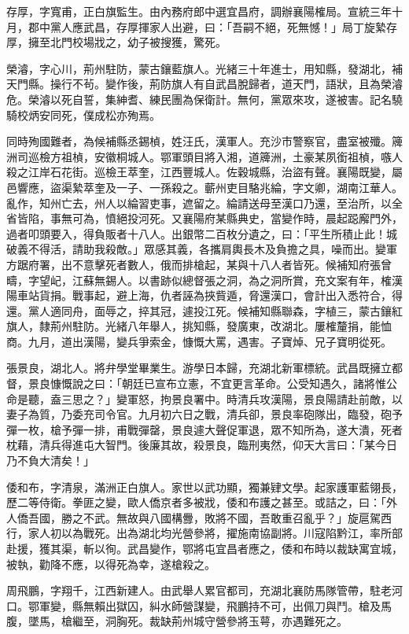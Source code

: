 \begin{pinyinscope}
存厚，字寬甫，正白旗監生。由內務府郎中選宜昌府，調辦襄陽榷局。宣統三年十月，郡中黨人應武昌，存厚揮家人出避，曰：「吾嗣不絕，死無憾！」局丁旋縶存厚，擁至北門校場戕之，幼子被搜獲，驚死。

榮濬，字心川，荊州駐防，蒙古鑲藍旗人。光緒三十年進士，用知縣，發湖北，補天門縣。操行不茍。變作後，荊防旗人有自武昌脫歸者，道天門，語狀，且為榮濬危。榮濬以死自誓，集紳耆、練民團為保衛計。無何，黨眾來攻，遂被害。記名驍騎校炳安同死，僕成松亦殉焉。

同時殉國難者，為候補縣丞錫楨，姓汪氏，漢軍人。充沙市警察官，盡室被殲。簰洲司巡檢方祖楨，安徽桐城人。鄂軍頭目將入湘，道簰洲，土豪某夙銜祖楨，嗾人殺之江岸石花街。巡檢王萃奎，江西豐城人。佐穀城縣，治盜有聲。襄陽既變，屬邑響應，盜渠縶萃奎及一子、一孫殺之。蘄州吏目駱兆綸，字文卿，湖南江華人。亂作，知州亡去，州人以綸習吏事，遮留之。綸請送母至漢口乃還，至治所，以全省皆陷，事無可為，憤絕投河死。又襄陽府某縣典史，當變作時，晨起跽廨門外，過者叩頭要入，得負販者十八人。出銀幣二百枚分遺之，曰：「平生所積止此！城破義不得活，請助我殺敵。」眾感其義，各攜肩輿長木及負擔之具，噪而出。變軍方踞府署，出不意擊死者數人，俄而排槍起，某與十八人者皆死。候補知府張曾疇，字望屺，江蘇無錫人。以書跡似總督張之洞，為之洞所賞，充文案有年，榷漢陽車站貨捐。戰事起，避上海，仇者誣為挾貲遁，脅還漢口，會計出入悉符合，得還。黨人適同舟，面辱之，捽其冠，遽投江死。候補知縣聯森，字植三，蒙古鑲紅旗人，隸荊州駐防。光緒八年舉人，挑知縣，發廣東，改湖北。屢榷釐捐，能恤商。九月，道出漢陽，變兵爭索金，慷慨大罵，遇害。子寶焯、兄子寶明從死。

張景良，湖北人。將弁學堂畢業生。游學日本歸，充湖北新軍標統。武昌既擁立都督，景良慷慨說之曰：「朝廷已宣布立憲，不宜更言革命。公受知遇久，諸將惟公命是聽，盍三思之？」變軍怒，拘景良署中。時清兵攻漢陽，景良陽請赴前敵，以妻子為質，乃委充司令官。九月初六日之戰，清兵卻，景良率砲隊出，臨發，砲予彈一枚，槍予彈一排，甫戰彈罄，景良遽大聲促軍退，眾不知所為，遂大潰，死者枕藉，清兵得進屯大智門。後廉其故，殺景良，臨刑夷然，仰天大言曰：「某今日乃不負大清矣！」

倭和布，字清泉，滿洲正白旗人。家世以武功顯，獨兼肄文學。起家護軍藍翎長，歷二等侍衛。拳匪之變，歐人僑京者多被戕，倭和布護之甚至。或詰之，曰：「外人僑吾國，勝之不武。無故與八國構釁，敗將不國，吾敢重召亂乎？」旋扈駕西行，家人初以為戰死。出為湖北均光營參將，擢施南協副將。川寇陷黔江，率所部赴援，獲其渠，斬以徇。武昌變作，鄂將屯宜昌者應之，倭和布時以裁缺寓宜城，被執，勸降不應，以得死為幸，遂槍殺之。

周飛鵬，字翔千，江西新建人。由武舉人累官都司，充湖北襄防馬隊管帶，駐老河口。鄂軍變，縣無賴出獄囚，糾水師營謀變，飛鵬持不可，出佩刀與鬥。槍及馬腹，墜馬，槍繼至，洞胸死。裁缺荊州城守營參將玉萼，亦遇難死之。


\end{pinyinscope}

